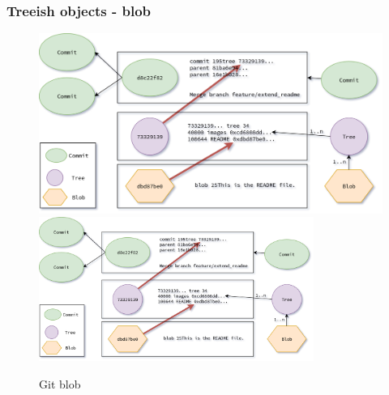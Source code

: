 \begin{frame}[noframenumbering]
    \frametitle{Treeish objects - blob}
    \addtocounter{page}{-1}
    \begin{figure}
        \begin{center}
            {
                \includegraphics[height=0.70\textheight,keepaspectratio]{./images/Treeish_Blob.png}
            }
            {
                \includegraphics[height=0.6\textheight,width=0.8\textwidth]{./images/Treeish_Blob.png}
            }
            \caption{Git blob}
        \end{center}
    \end{figure}
\end{frame}


